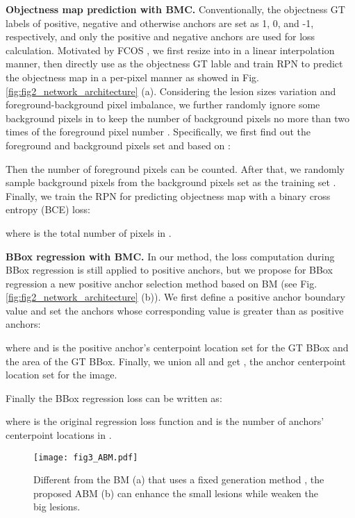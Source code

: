 \documentclass[runningheads]{llncs}
\begin{document}
\textbf{Objectness map prediction with BMC.}
Conventionally, the objectness GT labels of positive, negative and otherwise anchors are set as 1, 0, and -1, respectively, and only the positive and negative anchors are used for loss calculation.
Motivated by FCOS \cite{zhou2019objectsaspotints}, we first resize  into  in a linear interpolation manner, then directly use  as the objectness GT lable and train RPN to predict the objectness map in a per-pixel manner as showed in Fig. \ref{fig:fig2_network_architecture} (a).
Considering the lesion sizes variation and foreground-background  pixel imbalance, we further randomly ignore some background pixels in  to keep the number of background pixels no more than two times of the foreground pixel number . Specifically, we first find out the foreground and background pixels set  and  based on :

Then the number of foreground pixels  can be counted.
After that, we randomly sample  background pixels from the background pixels set  as the training set . Finally, we train the RPN for predicting objectness map  with a binary cross entropy (BCE) loss:

where  is the total number of pixels in .



\textbf{BBox regression with BMC.}
In our method, the loss computation  during BBox regression is still applied to positive anchors, but we propose for BBox regression a new positive anchor selection method based on BM (see Fig. \ref{fig:fig2_network_architecture} (b)). We first define a positive anchor boundary value   and set the anchors whose corresponding  value is greater  than  as positive  anchors:

where  and  is the positive anchor's centerpoint location set for the  GT BBox and the area of the  GT BBox. Finally, we union all  and get , the anchor centerpoint location set for the image.


Finally the BBox regression loss can be written as:

where  is the original regression loss function and  is the number of anchors' centerpoint locations in .

\begin{figure}[t]
  \centering
  \setlength{\abovecaptionskip}{-0.05cm}

   \texttt{[image: fig3\_ABM.pdf]}
  \caption{Different from the BM (a) that uses a fixed generation method \cite{li2020bounding}, the proposed ABM (b) can enhance the small lesions while weaken the big lesions.} \label{fig:fig3_ABM}

\end{figure}
\end{document}
